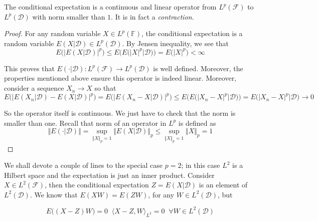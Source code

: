 \begin{proposition}
    The conditional expectation is a continuous and linear operator from $L^p(\mathcal{F})$ to $L^p(\mathcal{D})$ with norm smaller than $1$. It is in fact a \textit{contraction}.
\end{proposition}
\begin{proof}
    For any random variable $X \in L^p(\mathbb{F})$, the conditional expectation is a random variable $E(X \vert \mathcal{D}) \in L^p(\mathcal{D})$. By Jensen inequality, we see that
    \begin{equation*}
        E\Bigg( \Big\vert E(X\vert \mathcal{D}) \Big\vert^p \Bigg) \leq E\Bigg( E\Big( \big\vert X \big\vert^p \vert \mathcal{D} \Big)\Bigg) = E\Big( \vert X \vert^p \Big) < \infty
    \end{equation*}

    This proves that $E(\cdot \vert \mathcal{D}) : L^p(\mathcal{F}) \to L^p(\mathcal{D})$ is well defined. Moreover, the properties mentioned above ensure this operator is indeed linear. Moreover, consider a sequence $X_n \to X$ so that
    \begin{equation*}
        E\Bigg( \Big\vert E(X_n\vert \mathcal{D}) - E(X\vert \mathcal{D}) \Big\vert^p \Bigg) = E\Bigg( \Big\vert E(X_n - X\vert \mathcal{D}) \Big\vert^p \Bigg) \leq E\Big( E\big( \big\vert X_n - X \big\vert^p \vert \mathcal{D} \big) \Big) = E\big( \big\vert X_n - X \big\vert^p \vert \mathcal{D} \big) \to 0 
    \end{equation*}

    So the operator itself is continuous. We just have to check that the norm is smaller than one. Recall that norm of an operator in $L^p$ is defined as
    \begin{equation*}
        \Vert E(\cdot \vert \mathcal{D}) \Vert = \sup_{\Vert X \Vert_p = 1} \Vert E(X \vert \mathcal{D} ) \Vert_p \leq \sup_{\Vert X \Vert_p = 1} \Vert X \Vert_p = 1
    \end{equation*}
\end{proof}

We shall devote a couple of lines to the special case $p=2$; in this case $L^2$ is a Hilbert space and the expectation is just an inner product. Consider $X \in L^2(\mathcal{F})$, then the conditional expectation $Z = E(X \vert \mathcal{D})$ is an element of $L^2(\mathcal{D})$. We know that $E(X W) = E(Z W)$, for any $W \in L^2(\mathcal{D})$, but

\begin{equation*}
    E\big((X-Z) W \big) = 0 \;\; \langle X-Z, W \rangle_{L^2} = 0 \;\; \forall W \in L^2(\mathcal{D})
\end{equation*}

